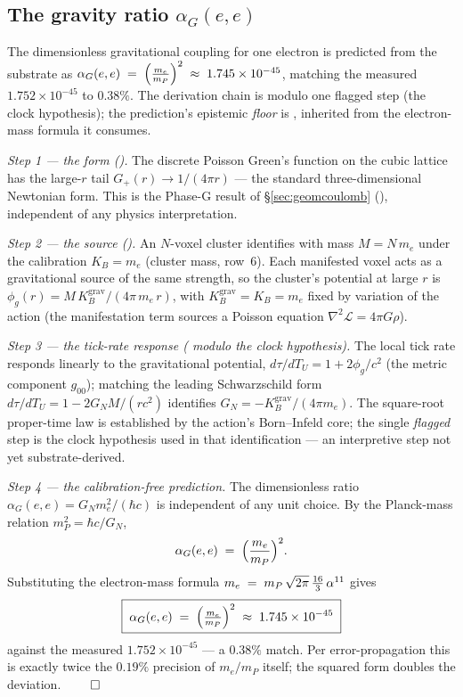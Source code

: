 \subsection{The gravity ratio $\alpha_G(e,e)$}
\label{sec:gravityratio}

\begin{claim}
The dimensionless gravitational coupling for one electron is predicted from the
substrate as $\alpha_G(e,e) \;=\; \Bigl(\tfrac{m_e}{m_P}\Bigr)^{2} \;\approx\; 1.745\times 10^{-45}$, matching the measured $1.752\times10^{-45}$ to $0.38\%$.
The derivation chain is  modulo one flagged  step (the clock
hypothesis); the prediction's epistemic \emph{floor} is , inherited
from the electron-mass formula it consumes.
\end{claim}

\emph{Step 1 --- the form ().} The discrete Poisson Green's function on
the cubic lattice has the large-$r$ tail $G_+(r) \to 1/(4\pi r)$ --- the standard
three-dimensional Newtonian form. This is the Phase-G result of
\S\ref{sec:geomcoulomb} (), independent of any physics interpretation.

\emph{Step 2 --- the source ().} An $N$-voxel cluster identifies with
mass $M = N\,m_e$ under the calibration $K_B = m_e$ (cluster mass, row~6). Each
manifested voxel acts as a gravitational source of the same strength, so the
cluster's potential at large $r$ is $\phi_g(r) = M\,K_B^{\mathrm{grav}}/(4\pi\,m_e\,r)$,
with $K_B^{\mathrm{grav}} = K_B = m_e$ fixed by variation of the action
(the manifestation term sources a Poisson equation $\nabla^2\mathcal{L} = 4\pi G\rho$).

\emph{Step 3 --- the tick-rate response ( modulo the clock hypothesis).}
The local tick rate responds linearly to the gravitational potential,
$d\tau/dT_U = 1 + 2\phi_g/c^2$ (the metric component $g_{00}$); matching the
leading Schwarzschild form $d\tau/dT_U = 1 - 2G_N M/(rc^2)$ identifies
$G_N = -K_B^{\mathrm{grav}}/(4\pi m_e)$. The square-root proper-time law is
established by the action's Born--Infeld core; the single \emph{flagged}
 step is the clock hypothesis used in that identification --- an
interpretive step not yet substrate-derived.

\emph{Step 4 --- the calibration-free prediction.} The dimensionless ratio
$\alpha_G(e,e) = G_N m_e^2/(\hbar c)$ is independent of any unit choice. By the
Planck-mass relation $m_P^2 = \hbar c/G_N$,
\[
  \alpha_G(e,e) \;=\; \Bigl(\frac{m_e}{m_P}\Bigr)^2 .
\]
Substituting the electron-mass formula $m_e \;=\; m_P\,\sqrt{2\pi}\,\tfrac{16}{3}\,\alpha^{11}$ gives
\[
  \boxed{\;\alpha_G(e,e) \;=\; \Bigl(\tfrac{m_e}{m_P}\Bigr)^{2} \;\approx\; 1.745\times 10^{-45}\;}
\]
against the measured $1.752\times10^{-45}$ --- a $0.38\%$ match. Per
error-propagation this is exactly twice the $0.19\%$ precision of $m_e/m_P$
itself; the squared form doubles the deviation. \hfill$\qed$


